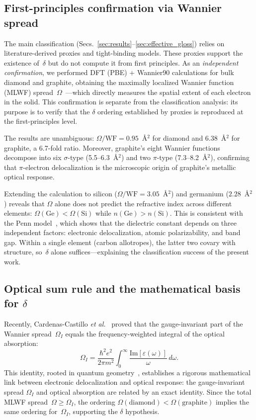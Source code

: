 \documentclass[twocolumn,showpacs,preprintnumbers,amsmath,amssymb,prb]{revtex4-2}
\begin{document}
\subsection{First-principles confirmation via Wannier spread}
\label{sec:wannier_confirmation}

The main classification (Secs.~\ref{sec:results}--\ref{sec:effective_gloss})
relies on literature-derived proxies and tight-binding models.
These proxies support the existence of~$\delta$ but do not compute it
from first principles. As an \emph{independent confirmation}, we
performed DFT (PBE) + Wannier90 calculations for bulk diamond and
graphite, obtaining the maximally localized Wannier function (MLWF)
spread~$\Omega$~\cite{Marzari1997}---which directly measures the
spatial extent of each electron in the solid.
This confirmation is separate from the classification analysis:
its purpose is to verify that the $\delta$ ordering established
by proxies is reproduced at the first-principles level.

The results are unambiguous: $\Omega/\mathrm{WF} = 0.95$~\AA$^2$ for
diamond and $6.38$~\AA$^2$ for graphite, a 6.7-fold ratio.
Moreover, graphite's eight Wannier functions decompose into six
$\sigma$-type (5.5--6.3~\AA$^2$) and two $\pi$-type
(7.3--8.2~\AA$^2$), confirming that $\pi$-electron delocalization
is the microscopic origin of graphite's metallic optical response.

Extending the calculation to silicon ($\Omega/\mathrm{WF} = 3.05$~\AA$^2$)
and germanium ($2.28$~\AA$^2$) reveals that $\Omega$ alone does not
predict the refractive index across different elements:
$\Omega(\mathrm{Ge}) < \Omega(\mathrm{Si})$ while
$n(\mathrm{Ge}) > n(\mathrm{Si})$. This is consistent with
the Penn model~\cite{Penn1962}, which shows that the dielectric constant
depends on three independent factors: electronic delocalization,
atomic polarizability, and band gap. Within a single element
(carbon allotropes), the latter two covary with structure, so~$\delta$
alone suffices---explaining the classification success of the present work.

\subsection{Optical sum rule and the mathematical basis for $\delta$}
\label{sec:sum_rule}

Recently, Cardenas-Castillo \textit{et al.}~\cite{CardenasCastillo2024}
proved that the gauge-invariant part of the Wannier spread~$\Omega_I$
equals the frequency-weighted integral of the optical absorption:
\begin{equation}
  \Omega_I = \frac{\hbar^2 e^2}{2\pi m^2}
  \int_0^\infty \frac{\mathrm{Im}[\varepsilon(\omega)]}{\omega}\,d\omega.
  \label{eq:sum_rule}
\end{equation}
This identity, rooted in quantum geometry~\cite{RhimKim2025},
establishes a rigorous mathematical link between electronic
delocalization and optical response: the gauge-invariant spread
$\Omega_I$ and optical absorption are related by an exact identity.
Since the total MLWF spread~$\Omega \geq \Omega_I$, the ordering
$\Omega(\mathrm{diamond}) < \Omega(\mathrm{graphite})$ implies the
same ordering for~$\Omega_I$, supporting the $\delta$ hypothesis.
\end{document}

